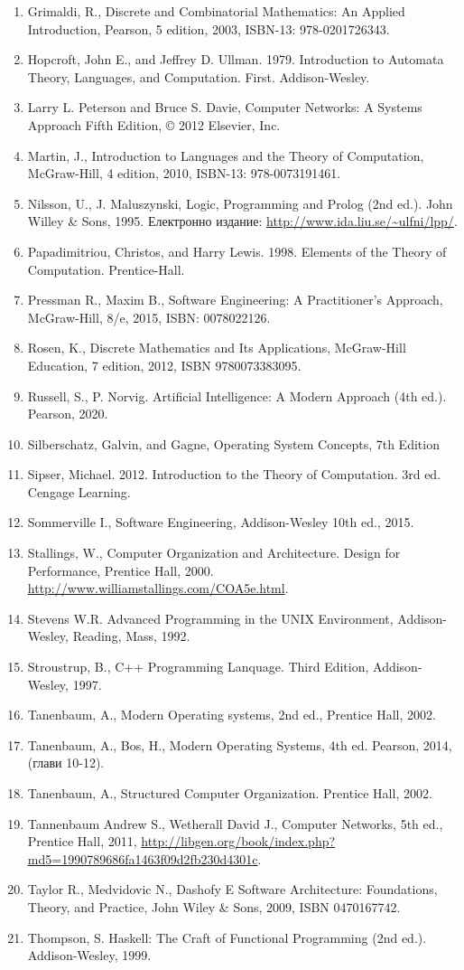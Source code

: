 \begin{enumerate}
\item Grimaldi, R., Discrete and Combinatorial Mathematics: An Applied Introduction, Pearson, 5 edition, 2003, ISBN-13: 978-0201726343.
\item Hopcroft, John E., and Jeffrey D. Ullman. 1979. Introduction to Automata Theory, Languages, and Computation. First. Addison-Wesley.
\item Larry L. Peterson and Bruce S. Davie, Computer Networks: A Systems Approach Fifth Edition, © 2012 Elsevier, Inc.
\item Martin, J., Introduction to Languages and the Theory of Computation, McGraw-Hill, 4 edition, 2010, ISBN-13: 978-0073191461.
\item Nilsson, U., J. Maluszynski, Logic, Programming and Prolog (2nd ed.). John Willey \& Sons, 1995. Електронно издание: \url{http://www.ida.liu.se/~ulfni/lpp/}.
\item Papadimitriou, Christos, and Harry Lewis. 1998. Elements of the Theory of Computation. Prentice-Hall.
\item Pressman R., Maxim B., Software Engineering: A Practitioner's Approach, McGraw-Hill, 8/e, 2015, ISBN: 0078022126.
\item Rosen, K., Discrete Mathematics and Its Applications, McGraw-Hill Education, 7 edition, 2012, ISBN 9780073383095.
\item Russell, S., P. Norvig. Artificial Intelligence: A Modern Approach (4th ed.). Pearson, 2020.
\item Silberschatz, Galvin, and Gagne, Operating System Concepts, 7th Edition
\item Sipser, Michael. 2012. Introduction to the Theory of Computation. 3rd ed. Cengage Learning.
\item Sommerville I., Software Engineering, Addison-Wesley 10th ed., 2015.
\item Stallings, W., Computer Organization and Architecture. Design for Performance, Prentice Hall, 2000. \url{http://www.williamstallings.com/COA5e.html}.
\item Stevens W.R. Advanced Programming in the UNIX Environment, Addison-Wesley, Reading, Mass, 1992.
\item Stroustrup, B., C++ Programming Lanquage. Third Edition, Addison-Wesley, 1997.
\item Tanenbaum, A., Modern Operating systems, 2nd ed., Prentice Hall, 2002.
\item Tanenbaum, A., Bos, H., Modern Operating Systems, 4th ed. Pearson, 2014, (глави 10-12).
\item Tanenbaum, A., Structured Computer Organization. Prentice Hall, 2002.
\item Tannenbaum Andrew S., Wetherall David J., Computer Networks, 5th ed., Prentice Hall, 2011, \url{http://libgen.org/book/index.php?md5=1990789686fa1463f09d2fb230d4301c}.
\item Taylor R., Medvidovic N., Dashofy E Software Architecture: Foundations, Theory, and Practice, John Wiley \& Sons, 2009, ISBN 0470167742.
\item Thompson, S. Haskell: The Craft of Functional Programming (2nd ed.). Addison-Wesley, 1999.
\end{enumerate}
\endgroup
